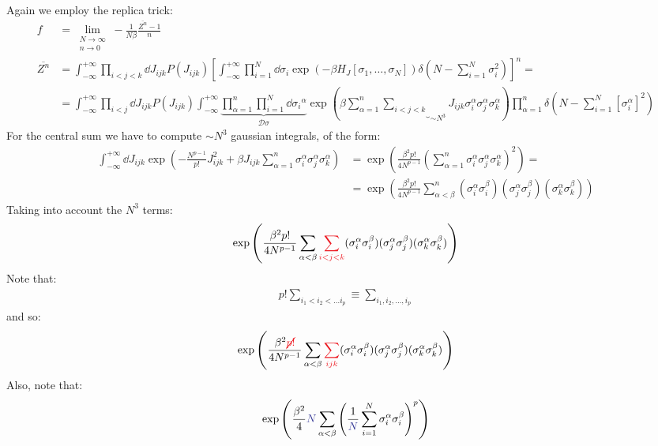 \documentclass[../template.tex]{subfiles}
\begin{document}
Again we employ the replica trick:
\begin{align*}
    f &= \lim_{\substack{N \to \infty\\ n \to 0}} - \frac{1}{N \beta} \frac{\overline{Z^n} - 1 }{n}\\
    \overline{Z^n} &=  \int_{-\infty}^{+\infty} \prod_{i<j<k} \dd{J_{ijk}} P(J_{ijk}) \left[\int_{-\infty}^{+\infty} \prod_{i=1}^N \dd{\sigma_i} \exp(-\beta H_J [\sigma_1, \dots, \sigma_N]) \delta\left(N-\sum_{i=1}^N \sigma_i^2\right)\right]^n =\\
    &= \int_{-\infty}^{+\infty} \prod_{i < j} \dd{J_{ijk}} P(J_{ijk}) \int_{-\infty}^{+\infty} \underbrace{\prod_{\alpha = 1}^n \prod_{i=1}^N \dd{\sigma_i}^\alpha }_{\mathcal{D}\sigma} \exp\left(\beta \sum_{\alpha=1}^n \underbrace{\sum_{i<j<k}}_{\sim N^3}  J_{ijk} \sigma_i^\alpha \sigma_j^\alpha \sigma_k^\alpha\right) \prod_{\alpha=1}^n \delta\left(N-\sum_{i=1}^N [\sigma_i^\alpha]^2\right)
\end{align*}
For the central sum we have to compute $\sim N^3$ gaussian integrals, of the form:
\begin{align*}
    \int_{-\infty}^{+\infty} \dd{J_{ijk}} \exp\left(-\frac{N^{p-1}}{p!} J_{ijk}^2 + \beta J_{ijk} \sum_{\alpha=1}^n \sigma_i^\alpha \sigma_j^\alpha \sigma_k^\alpha  \right) &= \exp\left(\frac{\beta^2 p!}{4 N^{p-1}} \left( \sum_{\alpha = 1}^n \sigma_i^\alpha \sigma_j^\alpha \sigma_k^\alpha\right )^2 \right) =\\
    &= \exp\left(\frac{\beta^2 p!}{4 N^{p-1}} \sum_{\alpha< \beta}^n (\sigma_i^\alpha \sigma_i^\beta) (\sigma_j^\alpha\sigma_j^\beta) (\sigma_k^\alpha \sigma_k^\beta)\right)
\end{align*} 
Taking into account the $N^3$ terms:
\begin{align*}
    \exp\left(\frac{\beta^2 p!}{4 N^{p-1}} \sum_{\alpha < \beta} \textcolor{Red}{\sum_{i< j < k}} (\sigma_i^\alpha \sigma_i^\beta) (\sigma_j^\alpha \sigma_j^\beta) (\sigma_k^\alpha \sigma_k^\beta)\right)
\end{align*} 
Note that:
\begin{align*}
    p! \sum_{i_1<i_2 < \dots i_p} \equiv \sum_{i_1, i_2,\dots,i_p}
\end{align*}
and so:
\begin{align*}
    \exp\left(\frac{\beta^2 \textcolor{Red}{\cancel{p!}}}{4 N^{p-1}} \sum_{\alpha < \beta} \textcolor{Red}{\sum_{ijk}} (\sigma_i^\alpha \sigma_i^\beta) (\sigma_j^\alpha \sigma_j^\beta) (\sigma_k^\alpha \sigma_k^\beta)\right)
\end{align*}
Also, note that:
\begin{align*}
    \exp\left(\frac{\beta^2}{4} \textcolor{Blue}{N} \sum_{\alpha < \beta} \left(\frac{1}{\textcolor{Blue}{N}}\sum_{i=1}^N \sigma_i^\alpha \sigma_i^\beta \right)^p \right)
\end{align*}
\end{document}
